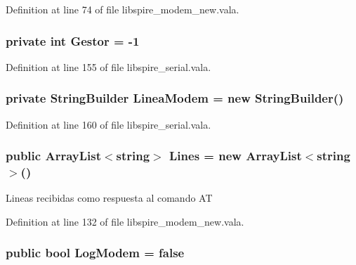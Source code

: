 Definition at line 74 of file libspire\-\_\-modem\-\_\-new.\-vala.

\hypertarget{namespaceedwinspire_1_1_ports_a5b6e04d991b7c31daba0475fc35b000e}{
\subsubsection[{Gestor}]{\setlength{\rightskip}{0pt plus 5cm}private int Gestor = -\/1}}\label{namespaceedwinspire_1_1_ports_a5b6e04d991b7c31daba0475fc35b000e}


Definition at line 155 of file libspire\-\_\-serial.\-vala.

\hypertarget{namespaceedwinspire_1_1_ports_a0a27f70484241b1637ed57e95d4a0d26}{
\subsubsection[{Linea\-Modem}]{\setlength{\rightskip}{0pt plus 5cm}private String\-Builder Linea\-Modem = new String\-Builder()}}\label{namespaceedwinspire_1_1_ports_a0a27f70484241b1637ed57e95d4a0d26}


Definition at line 160 of file libspire\-\_\-serial.\-vala.

\hypertarget{namespaceedwinspire_1_1_ports_a6989ba34677ae553d4d312c9ae744532}{
\subsubsection[{Lines}]{\setlength{\rightskip}{0pt plus 5cm}public Array\-List$<$string$>$ Lines = new Array\-List$<$string$>$()}}\label{namespaceedwinspire_1_1_ports_a6989ba34677ae553d4d312c9ae744532}


Lineas recibidas como respuesta al comando A\-T 



Definition at line 132 of file libspire\-\_\-modem\-\_\-new.\-vala.

\hypertarget{namespaceedwinspire_1_1_ports_abd75369bb807e77b40ebbda7fc76eeed}{
\subsubsection[{Log\-Modem}]{\setlength{\rightskip}{0pt plus 5cm}public bool Log\-Modem = false}}\label{namespaceedwinspire_1_1_ports_abd75369bb807e77b40ebbda7fc76eeed}


